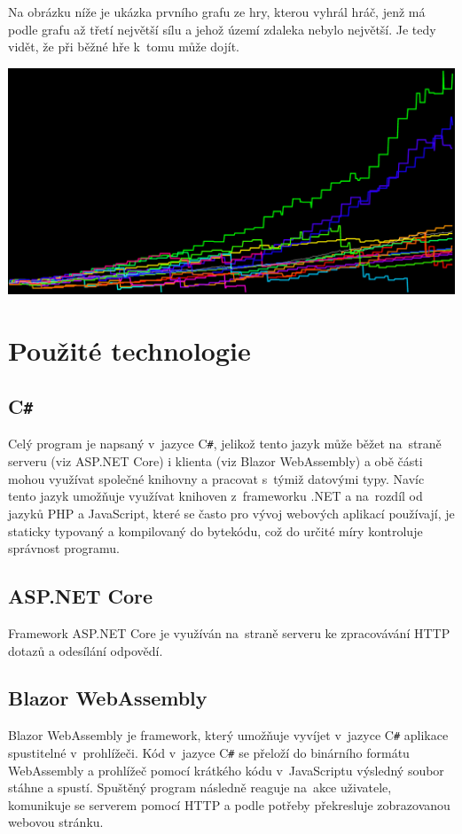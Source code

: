\documentclass[a4paper,12pt]{article}
\def\CS{C\texttt{\#}}
\begin{document}
Na obrázku níže je ukázka prvního grafu ze hry, kterou vyhrál hráč, jenž má podle grafu až třetí největší sílu a jehož území zdaleka nebylo největší. Je tedy vidět, že při běžné hře k~tomu může dojít.

\includegraphics[width=\textwidth]{PowersGraph.png}

\section{Použité technologie}
\subsection{\CS{}}
Celý program je napsaný v~jazyce \CS{}, jelikož tento jazyk může běžet na~straně serveru (viz ASP.NET Core) i klienta (viz Blazor WebAssembly) a obě části mohou využívat společné knihovny a pracovat s~týmiž datovými typy. Navíc tento jazyk umožňuje využívat knihoven z~frameworku .NET a na~rozdíl od jazyků PHP a JavaScript, které se často pro vývoj webových aplikací používají, je staticky typovaný a kompilovaný do bytekódu, což do určité míry kontroluje správnost programu.
\subsection{ASP.NET Core}
Framework ASP.NET Core je využíván na~straně serveru ke zpracovávání HTTP dotazů a odesílání odpovědí.
\subsection{Blazor WebAssembly}
Blazor WebAssembly je framework, který umožňuje vyvíjet v~jazyce \CS{} aplikace spustitelné v~prohlížeči. Kód v~jazyce \CS{} se přeloží do binárního formátu WebAssembly a prohlížeč pomocí krátkého kódu v~JavaScriptu výsledný soubor stáhne a spustí. Spuštěný program následně reaguje na~akce uživatele, komunikuje se serverem pomocí HTTP a podle potřeby překresluje zobrazovanou webovou stránku.
\end{document}
